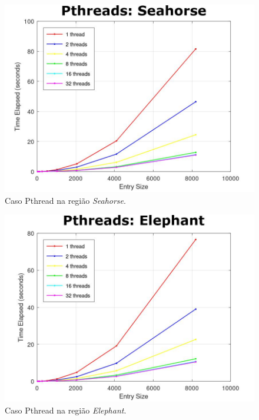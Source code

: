\documentclass[a4paper, 12pt]{article}
\begin{document}
\begin{figure}[H]
	\centering
	\includegraphics[scale=0.45]{pth_seahorse}
	\caption{Caso Pthread na região \textit{Seahorse}.}
\end{figure}

\begin{figure}[H]
	\centering
	\includegraphics[scale=0.45]{pth_elephant}
	\caption{Caso Pthread na região \textit{Elephant}.}
\end{figure}
\end{document}
